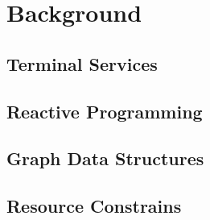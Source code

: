 \chapter{Background}
\label{sec:back}



\section{Terminal Services}

\section{Reactive Programming}

\section{Graph Data Structures}

\section{Resource Constrains}